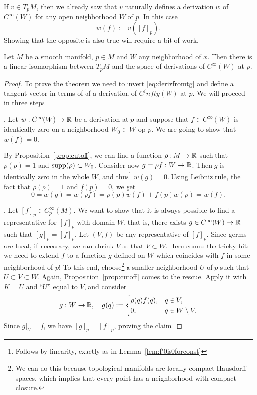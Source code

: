 If $v\in T_p M$, then we already saw that $v$ naturally defines a derivation $w$ of $C^\infty(W)$ for any open neighborhood $W$ of $p$.
In this case
\begin{equation}\label{eq:derivfromtg}
  w(f) := v([f]_p).
\end{equation}
Showing that the opposite is also true will require a bit of work.

\begin{proposition}
  Let $M$ be a smooth manifold, $p\in M$ and $W$ any neighborhood of $x$.
  Then there is a linear isomorphism between $T_p M$ and the space of derivations of $C^\infty(W)$ at $p$.
\end{proposition}
\begin{proof}
  To prove the theorem we need to invert \eqref{eq:derivfromtg} and define a tangent vector in terms of of a derivation of $C^infty(W)$ at $p$.
  We will proceed in three steps

  . Let $w:C^\infty(W) \to\mathbb{R}$ be a derivation at $p$ and suppose that $f\in C^\infty(W)$ is identically zero on a neighborhood $W_0\subset W$ op $p$. We are going to show that $w(f)=0$.

  By Proposition~\ref{prop:cutoff}, we can find a function $\rho:M\to\mathbb{R}$ such that $\rho(p)=1$ and $\operatorname{supp}(\rho) \subset W_0$. Consider now $g = \rho f : W \to \mathbb{R}$. Then $g$ is identically zero in the whole $W$, and thus\footnote{Follows by linearity, exactly as in Lemma~\ref{lem:f'0is0forconst}} $w(g) = 0$. Using Leibniz rule, the fact that $\rho(p)=1$ and $f(p) = 0$, we get
  \begin{equation}
    0 = w(g) = w(\rho f) = \rho(p) w(f) + f(p)w(\rho) = w(f).
  \end{equation}

  .
  Let $[f]_p\in C_p^\infty(M)$.
  We want to show that it is always possible to find a representative for $[f]_p$ with domain $W$, that is, there exists $g\in C^\infty(W)\to\mathbb{R}$ such that $[g]_p = [f]_p$.
  Let $(V, f)$ be any representative of $[f]_p$.
  Since germs are local, if necessary, we can shrink $V$ so that $V\subset W$.
  Here comes the tricky bit: we need to extend $f$ to a function $g$ defined on $W$ which coincides with $f$ in some neighborhood of $p$!
  To this end, choose\footnote{We can do this because topological manifolds are locally compact Hausdorff spaces, which implies that every point has a neighborhood with compact closure.} a smaller neighborhood $U$ of $p$ such that $\overline{U}\subset V\subset W$.
  Again, Proposition~\ref{prop:cutoff} comes to the rescue. Apply it with $K=\overline{U}$ and ``$U$'' equal to $V$, and consider
  \begin{equation}
    g:W\to\mathbb{R}, \quad
    g(q) := \begin{cases}
      \rho(q)f(q), & q\in V,\\
      0, & q \in W\setminus V.
    \end{cases}
  \end{equation}
  Since $g|_U = f$, we have $[g]_p = [f]_p$, proving the claim.


\end{proof}

